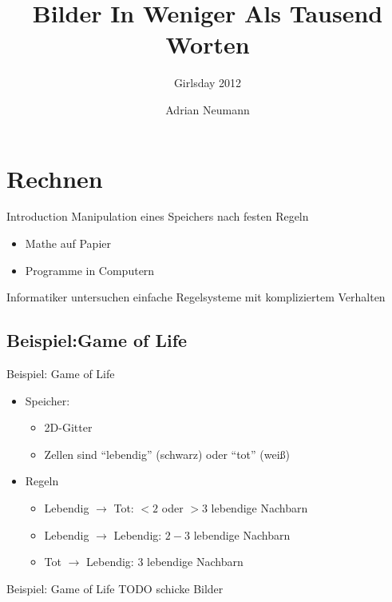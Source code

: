 \documentclass{beamer}
\title{Bilder In Weniger Als Tausend Worten}
\subtitle{Girlsday 2012}
\institute{Universit\"at des Saarlandes}
\date{}
\author[A. Neumann]{
	Adrian Neumann
}
\theoremstyle{example}
\begin{document}
\frame{\titlepage}

\section{Rechnen}
\begin{frame}{Introduction}
Manipulation eines Speichers nach festen Regeln
\begin{itemize}
\item Mathe auf Papier
\item Programme in Computern
\end{itemize}
\begin{block}{}\centering
Informatiker untersuchen einfache Regelsysteme mit kompliziertem Verhalten
\end{block}
\end{frame}

\subsection{Beispiel:Game of Life}
\begin{frame}{Beispiel: Game of Life}
\begin{itemize}
\item Speicher: 
  \begin{itemize}
    \item 2D-Gitter
    \item Zellen sind ``lebendig'' (schwarz) oder ``tot'' (weiß)
  \end{itemize}
\item Regeln
  \begin{itemize}
  \item Lebendig $\rightarrow$ Tot: $<2$ oder $>3$ lebendige Nachbarn
  \item Lebendig $\rightarrow$ Lebendig: $2-3$ lebendige Nachbarn
  \item Tot $\rightarrow$ Lebendig: 3 lebendige Nachbarn
  \end{itemize}
\end{itemize}
\end{frame}

\begin{frame}{Beispiel: Game of Life}
  TODO schicke Bilder
\end{frame}
\end{document}
